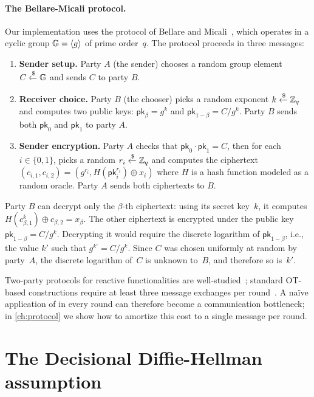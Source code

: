 \paragraph{The Bellare-Micali protocol.}
Our implementation uses the \OT{} protocol of Bellare and Micali~\cite{BM89}, which operates in a cyclic group $\mathbb{G} = \left\langle g \right\rangle$ of prime order~$q$. The protocol proceeds in three messages:
\begin{enumerate}
    \item \textbf{Sender setup.} Party $A$ (the sender) chooses a random group element $C \xleftarrow{\$} \mathbb{G}$ and sends $C$ to party $B$.
    \item \textbf{Receiver choice.} Party $B$ (the chooser) picks a random exponent $k \xleftarrow{\$} \mathbb{Z}_q$ and computes two public keys: $\mathsf{pk}_\beta = g^k$ and $\mathsf{pk}_{1-\beta} = C / g^k$. Party $B$ sends both $\mathsf{pk}_0$ and $\mathsf{pk}_1$ to party $A$.
    \item \textbf{Sender encryption.} Party $A$ checks that $\mathsf{pk}_0 \cdot \mathsf{pk}_1 = C$, then for each $i \in \{0,1\}$, picks a random $r_i \xleftarrow{\$} \mathbb{Z}_q$ and computes the ciphertext $(c_{i,1}, c_{i,2}) = (g^{r_i}, H(\mathsf{pk}_i^{r_i}) \oplus x_i)$ where $H$ is a hash function modeled as a random oracle. Party $A$ sends both ciphertexts to $B$.
\end{enumerate}
Party $B$ can decrypt only the $\beta$-th ciphertext: using its secret key~$k$, it computes $H(c_{\beta,1}^k) \oplus c_{\beta,2} = x_\beta$. The other ciphertext is encrypted under the public key $\mathsf{pk}_{1-\beta} = C/g^k$. Decrypting it would require the discrete logarithm of $\mathsf{pk}_{1-\beta}$, i.e., the value $k'$ such that $g^{k'} = C/g^k$. Since $C$ was chosen uniformly at random by party~$A$, the discrete logarithm of~$C$ is unknown to~$B$, and therefore so is~$k'$.

Two-party protocols for reactive functionalities are well-studied~\cite{HL10}; standard OT-based constructions require at least three message exchanges per round~\cite{CSW20}. A na\"ive application of \OT{} in every round can therefore become a communication bottleneck; in \cref{ch:protocol} we show how to amortize this cost to a single message per round.

\section{The Decisional Diffie-Hellman assumption}\label{sec:ddh}

